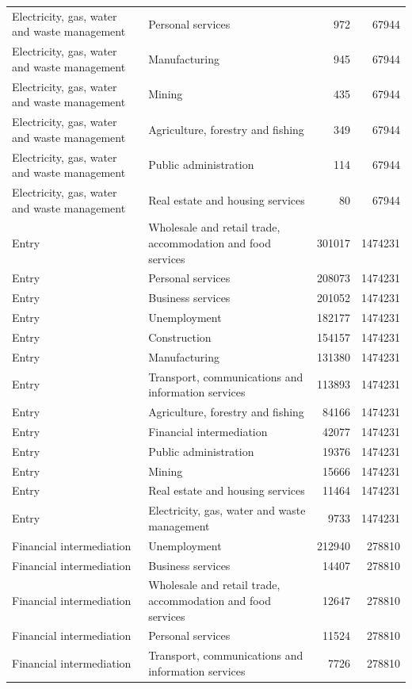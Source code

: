 \begin{longtable}{llrr}
Electricity, gas, water and waste management & Personal services & 972 & 67944 \\
Electricity, gas, water and waste management & Manufacturing & 945 & 67944 \\
Electricity, gas, water and waste management & Mining & 435 & 67944 \\
Electricity, gas, water and waste management & Agriculture, forestry and fishing & 349 & 67944 \\
Electricity, gas, water and waste management & Public administration & 114 & 67944 \\
Electricity, gas, water and waste management & Real estate and housing services & 80 & 67944 \\
Entry & Wholesale and retail trade, accommodation and food services & 301017 & 1474231 \\
Entry & Personal services & 208073 & 1474231 \\
Entry & Business services & 201052 & 1474231 \\
Entry & Unemployment & 182177 & 1474231 \\
Entry & Construction & 154157 & 1474231 \\
Entry & Manufacturing & 131380 & 1474231 \\
Entry & Transport, communications and information services & 113893 & 1474231 \\
Entry & Agriculture, forestry and fishing & 84166 & 1474231 \\
Entry & Financial intermediation & 42077 & 1474231 \\
Entry & Public administration & 19376 & 1474231 \\
Entry & Mining & 15666 & 1474231 \\
Entry & Real estate and housing services & 11464 & 1474231 \\
Entry & Electricity, gas, water and waste management & 9733 & 1474231 \\
Financial intermediation & Unemployment & 212940 & 278810 \\
Financial intermediation & Business services & 14407 & 278810 \\
Financial intermediation & Wholesale and retail trade, accommodation and food services & 12647 & 278810 \\
Financial intermediation & Personal services & 11524 & 278810 \\
Financial intermediation & Transport, communications and information services & 7726 & 278810 \\

\end{longtable}
